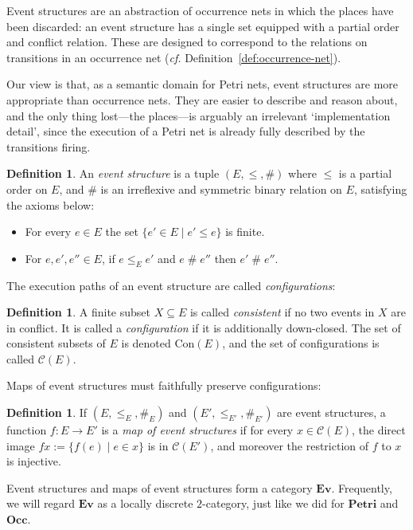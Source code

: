 \documentclass[11pt,a4paper]{article}
\theoremstyle{plain}
\theoremstyle{definition}
\newtheorem{definition}[theorem]{Definition}
\theoremstyle{remark}
\newcommand{\Occ}{\mathbf{Occ}}
\newcommand{\Petri}{\mathbf{Petri}}
\newcommand{\ES}{\mathbf{Ev}}
\newcommand{\Con}{\mathrm{Con}}
\newcommand{\conf}{\mathscr{C}}
\begin{document}
Event structures \cite{ES1} are an abstraction of occurrence nets in which the places have been discarded: an event structure has a single set equipped with a partial order and conflict relation. These are designed to correspond to the relations on transitions in an occurrence net (\emph{cf.} Definition~\ref{def:occurrence-net}).

Our view is that, as a semantic domain for Petri nets, event structures are more appropriate than occurrence nets. They are easier to describe and reason about, and the only thing lost---the places---is arguably an irrelevant `implementation detail', since the execution of a Petri net is already fully described by the transitions firing.


\begin{definition}
An \emph{event structure} is a tuple $(E, {\leq}, \#)$ where $\leq$ is a partial order on $E$, and $\#$  is an irreflexive and symmetric binary relation on $E$, satisfying the axioms below:
\begin{itemize}
    \item For every $e \in E$  the set $\{e' \in E \mid e' \leq e \}$ is finite.
    \item For $e, e', e'' \in E$, if $e \leq_{E} e'$ and $e \mathrel{\#} e''$ then $e' \mathrel{\#} e''$.
\end{itemize}
\end{definition}
The execution paths of an event structure are called \emph{configurations}:
\begin{definition}
    A finite subset $X \subseteq E$ is called \emph{consistent} if no two events in $X$ are in conflict. It is called a \emph{configuration} if it is additionally down-closed. The set of consistent subsets of $E$ is denoted $\Con(E)$, and the set of configurations is called $\conf(E)$.
\end{definition}
Maps of event structures must faithfully preserve configurations:
\begin{definition}
    If $(E, \leq_E, \#_E)$ and $(E', \leq_{E'}, \#_{E'})$ are event structures, a function $f: E \rightarrow E'$ is a \emph{map of event structures} if for every $x \in \conf(E)$, the direct image $fx := \{f(e) \mid e \in x\}$ is in $\conf(E')$, and moreover the restriction of $f$ to $x$ is injective.
\end{definition}
Event structures and maps of event structures form a category $\ES$. Frequently, we will regard $\ES$ as a locally discrete $2$-category, just like we did for $\Petri$ and $\Occ$.
\end{document}
